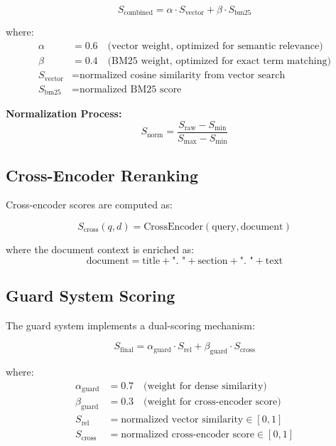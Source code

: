 \documentclass[11pt,a4paper]{article}
\begin{document}
\begin{equation}
S_{\text{combined}} = \alpha \cdot S_{\text{vector}} + \beta \cdot S_{\text{bm25}}
\end{equation}

where:
\begin{align}
\alpha &= 0.6 \quad \text{(vector weight, optimized for semantic relevance)}\\
\beta &= 0.4 \quad \text{(BM25 weight, optimized for exact term matching)}\\
S_{\text{vector}} &= \text{normalized cosine similarity from vector search}\\
S_{\text{bm25}} &= \text{normalized BM25 score}
\end{align}

\textbf{Normalization Process:}
\begin{equation}
S_{\text{norm}} = \frac{S_{\text{raw}} - S_{\text{min}}}{S_{\text{max}} - S_{\text{min}}}
\end{equation}

\subsection{Cross-Encoder Reranking}

Cross-encoder scores are computed as:

\begin{equation}
S_{\text{cross}}(q, d) = \text{CrossEncoder}(\text{query}, \text{document})
\end{equation}

where the document context is enriched as:
\begin{equation}
\text{document} = \text{title} + \text{". "} + \text{section} + \text{". "} + \text{text}
\end{equation}

\subsection{Guard System Scoring}

The guard system implements a dual-scoring mechanism:

\begin{equation}
S_{\text{final}} = \alpha_{\text{guard}} \cdot S_{\text{rel}} + \beta_{\text{guard}} \cdot S_{\text{cross}}
\end{equation}

where:
\begin{align}
\alpha_{\text{guard}} &= 0.7 \quad \text{(weight for dense similarity)}\\
\beta_{\text{guard}} &= 0.3 \quad \text{(weight for cross-encoder score)}\\
S_{\text{rel}} &= \text{normalized vector similarity} \in [0,1]\\
S_{\text{cross}} &= \text{normalized cross-encoder score} \in [0,1]
\end{align}
\end{document}
